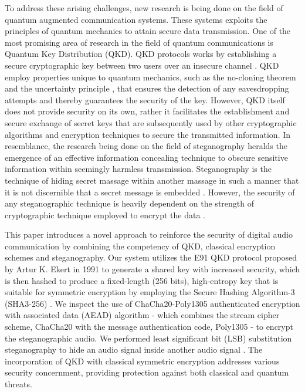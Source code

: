 \documentclass{article}
\begin{document}
To address these arising challenges, new research is being done on the field of quantum augmented communication systems. These systems exploits the principles of quantum mechanics to attain secure data transmission. One of the most promising area of research in the field of quantum communications is Quantum Key Distribution (QKD). QKD protocols works by establishing a secure cryptographic key between two users over an insecure channel \cite{alleaume2014using}. QKD employ properties unique to quantum mechanics, such as the no-cloning theorem \cite{buvzek1996quantum} and the uncertainty principle \cite{sen2014uncertainty}, that ensures the detection of any eavesdropping attempts and thereby guarantees the security of the key. However, QKD itself does not provide security on its own, rather it facilitates the establishment and secure exchange of secret keys that are subsequently used by other cryptographic algorithms and encryption techniques to secure the transmitted information. In resemblance, the research being done on the field of steganography heralds the emergence of an effective information concealing technique to obscure sensitive information within seemingly harmless transmission. Steganography is the technique of hiding secret massage within another massage in such a manner that it is not discernible that a secret message is embedded \cite{Kahn1996}. However, the security of any steganographic technique is heavily dependent on the strength of cryptographic technique employed to encrypt the data \cite{anderson1998limits}.

This paper introduces a novel approach to reinforce the security of digital audio communication by combining the competency of QKD, classical encryption schemes and steganography. Our system utilizes the E91 QKD protocol proposed by Artur K. Ekert in 1991 \cite{Ekert1991} to generate a shared key with increased security, which is then hashed to produce a fixed-length (256 bits), high-entropy key that is suitable for symmetric encryption by employing the Secure Hashing Algorithm-3 (SHA3-256) \cite{dworkin2015sha}. We inspect the use of ChaCha20-Poly1305 authenticated encryption with associated data (AEAD) algorithm \cite{rfc7539} - which combines the stream cipher scheme, ChaCha20 \cite{bernstein2008chacha} with the message authentication code, Poly1305 \cite{bernstein2005poly1305} - to encrypt the steganographic audio. We performed least significant bit (LSB) substitution steganography to hide an audio signal inside another audio signal \cite{cvejic2002increasing}. The incorporation of QKD with classical symmetric encryption addresses various security concernment, providing protection against both classical and quantum threats.
\end{document}
